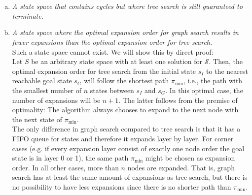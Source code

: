 \documentclass{article} %
\begin{document}
\section{}
\begin{enumerate}[(a)]
    \item \textit{A state space that contains cycles but where
    tree search is still guaranteed to terminate.} \\[0.5em]
    \item \textit{A state space where the optimal expansion
    order for graph search results in fewer expansions than
    the optimal expansion order for tree search.}\\[0.5em]
    Such a state space cannot exist. We will show this by
    direct proof:\\[0.3em]
    Let $S$ be an arbitrary state space with at least one
    solution for $\mathcal{S}$. Then, the optimal expansion
    order for tree search from the initial state $s_I$ to
    the nearest reachable goal state $s_G$ will follow the
    shortest path $\pi_{\text{min}}$, i.e., the path with the smallest
    number of $n$ states between $s_I$ and $s_G$. In this
    optimal case, the number of expansions will be $n+1$.
    The latter follows from the premise of optimality: The
    algorithm always chooses to expand to the next node
    with the next state of $\pi_{\text{min}}$.\\[0.3em]
    The only difference in graph search compared to tree search
    is that it has a FIFO queue for states and therefore
    it expands layer by layer. For corner cases (e.g. if
    every expansion layer consist of exactly one node order
    the goal state is in layer 0 or 1), the same path
    $\pi_{\text{min}}$ might be chosen as expansion order.
    In all other cases, more than $n$ nodes are expanded.
    That is, graph search has at least the same amount of
    expansions as tree search, but there is no possibility
    to have less expansions since there is no shorter path
    than $\pi_{\text{min}}$.

\end{enumerate}
\end{document}
